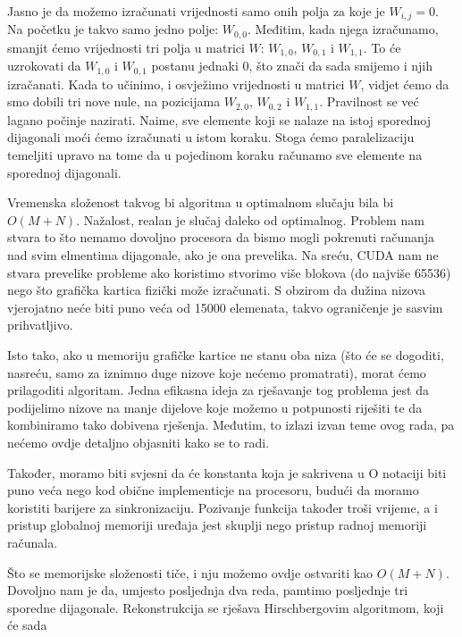 \documentclass[times, utf8, zavrsni]{fer}
\begin{document}

Jasno je da možemo izračunati vrijednosti samo onih polja
za koje je $W_{i,j}=0$. Na početku je takvo samo jedno polje:
$W_{0,0}$. Međitim, kada njega izračunamo, smanjit ćemo
vrijednosti tri polja u matrici $W$: $W_{1,0}$, $W_{0,1}$ i
$W_{1,1}$. To će uzrokovati da $W_{1,0}$ i $W_{0,1}$ postanu
jednaki $0$, što znači da sada smijemo i njih izračanati.
Kada to učinimo, i osvježimo vrijednosti u matrici $W$, 
vidjet ćemo da smo dobili tri nove nule, na pozicijama
$W_{2,0}$, $W_{0,2}$ i $W_{1,1}$. Pravilnost se već
lagano počinje nazirati. Naime, sve elemente koji 
se nalaze na istoj sporednoj dijagonali moći ćemo 
izračunati u istom koraku. Stoga ćemo paralelizaciju
temeljiti upravo na tome da u pojedinom koraku
računamo sve elemente na sporednoj dijagonali. 


Vremenska složenost takvog bi algoritma u optimalnom slučaju bila
bi $O(M+N)$. Nažalost, realan je slučaj daleko od optimalnog. 
Problem nam stvara to što nemamo dovoljno procesora da bismo
mogli pokrenuti računanja nad svim elmentima dijagonale, ako je
ona prevelika. Na sreću, CUDA nam ne stvara prevelike probleme
ako koristimo stvorimo više blokova (do najviše 65536) nego što
grafička kartica fizički može izračunati. S obzirom da dužina
nizova vjerojatno neće biti puno veća od 15000 elemenata, 
takvo ograničenje je sasvim prihvatljivo.

Isto tako, ako u memoriju grafičke kartice ne stanu
oba niza (što će se dogoditi, nasreću, samo za iznimno
duge nizove koje nećemo promatrati), morat ćemo prilagoditi
algoritam. Jedna efikasna ideja
za rješavanje tog problema jest da podijelimo nizove na manje
dijelove koje možemo u potpunosti riješiti te da kombiniramo
tako dobivena rješenja. 
Međutim, to izlazi izvan teme ovog rada, pa nećemo
ovdje detaljno objasniti kako se to radi.

Također, moramo biti svjesni da će konstanta koja je sakrivena u O
notaciji biti puno veća nego kod obične implementicje na procesoru,
budući da moramo koristiti barijere za sinkronizaciju. Pozivanje
funkcija također troši vrijeme, a i pristup globalnoj memoriji
uređaja jest skuplji nego pristup radnoj memoriji računala. 

Što se memorijske složenosti tiče, i nju možemo ovdje ostvariti
kao $O(M+N)$. Dovoljno nam je da, umjesto posljednja dva reda,
pamtimo posljednje tri sporedne dijagonale. Rekonstrukcija
se rješava Hirschbergovim algoritmom, koji će sada 
\end{document}
